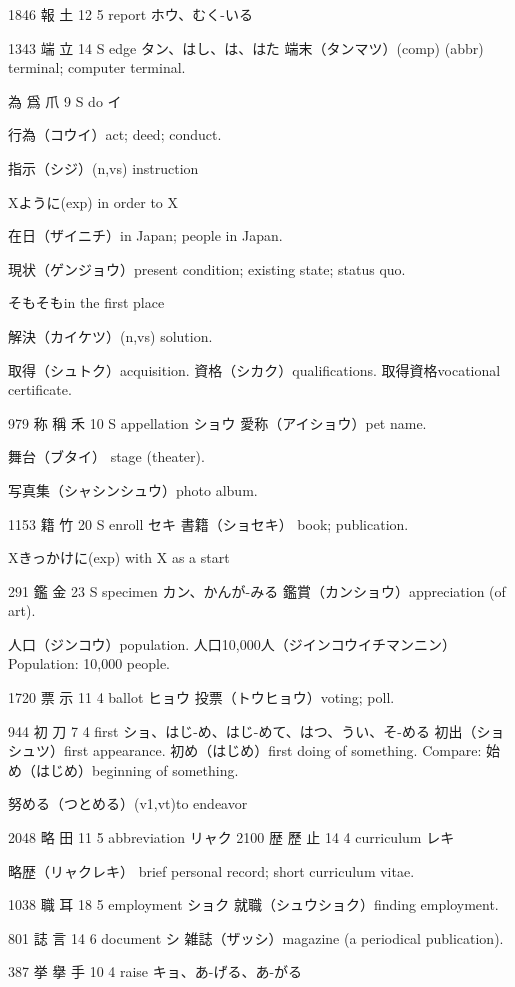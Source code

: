 1846 報  土 12 5  report ホウ、むく-いる

1343 端  立 14 S  edge タン、はし、は、はた
端末（タンマツ）(comp) (abbr) terminal; computer terminal.

為 爲 爪 9 S  do イ

行為（コウイ）act; deed; conduct.

指示（シジ）(n,vs) instruction

Xように(exp) in order to X

在日（ザイニチ）in Japan; people in Japan.

現状（ゲンジョウ）present condition; existing state; status quo.

そもそもin the first place

解決（カイケツ）(n,vs) solution.

取得（シュトク）acquisition.
資格（シカク）qualifications.
取得資格vocational certificate.

979	称	稱	禾	10	S		appellation	ショウ
愛称（アイショウ）pet name.

舞台（ブタイ）
stage (theater).

写真集（シャシンシュウ）photo album.

1153	籍		竹	20	S		enroll	セキ
書籍（ショセキ）
book; publication.

Xきっかけに(exp) with X as a start

291	鑑		金	23	S		specimen	カン、かんが-みる
鑑賞（カンショウ）appreciation (of art).

人口（ジンコウ）population.
人口10,000人（ジインコウイチマンニン）
Population: 10,000 people.

1720	票		示	11	4		ballot	ヒョウ
投票（トウヒョウ）voting; poll.

944	初		刀	7	4		first	ショ、はじ-め、はじ-めて、はつ、うい、そ-める
初出（ショシュツ）first appearance.
初め（はじめ）first doing of something.
Compare: 始め（はじめ）beginning of something.

努める（つとめる）(v1,vt)to endeavor

2048	略		田	11	5		abbreviation	リャク
2100	歴	歷	止	14	4		curriculum	レキ

略歴（リャクレキ）
brief personal record;
short curriculum vitae.

1038	職		耳	18	5		employment	ショク
就職（シュウショク）finding employment.

801	誌		言	14	6		document	シ
雑誌（ザッシ）magazine (a periodical publication).

387	挙	擧	手	10	4		raise	キョ、あ-げる、あ-がる

